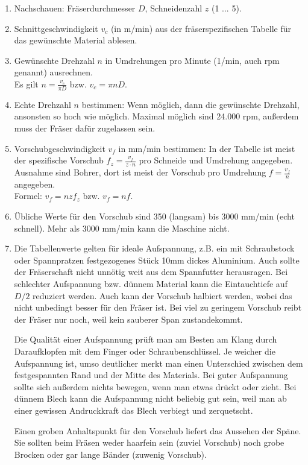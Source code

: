 \documentclass{\basedir/fablab-document}
\begin{document}
\begin{enumerate}
	\item Nachschauen: Fräserdurchmesser $D$, Schneidenzahl $z$ (1 ... 5).
	\item Schnittgeschwindigkeit $v_c$ (in m/min) aus der fräserspezifischen Tabelle für das gewünschte Material ablesen.
	\item Gewünschte Drehzahl $n$ in Umdrehungen pro Minute (1/min, auch rpm genannt) ausrechnen.\\
		Es gilt $n=\frac{v_c}{\pi D}$ bzw. $v_c=\pi n D$.
	\item Echte Drehzahl $n$ bestimmen: Wenn möglich, dann die gewünschte Drehzahl, ansonsten so hoch wie möglich. Maximal möglich sind 24.000 rpm, außerdem muss der Fräser dafür zugelassen sein.
	\item Vorschubgeschwindigkeit $v_f$ in mm/min bestimmen: In der Tabelle ist meist der spezifische Vorschub $f_z=\frac{v_f}{z\cdot n}$ pro Schneide und Umdrehung angegeben. Ausnahme sind Bohrer, dort ist meist der Vorschub pro Umdrehung $f=\frac{v_f}{n}$ angegeben. \\
		Formel: $v_f = n z f_z$ bzw. $v_f=n f$.
	\item Übliche Werte für den Vorschub sind 350 (langsam) bis 3000 mm/min (echt schnell). Mehr als 3000 mm/min kann die Maschine nicht.
	\item Die Tabellenwerte gelten für ideale Aufspannung, z.B. ein mit Schraubstock oder Spannpratzen festgezogenes Stück 10mm dickes Aluminium. Auch sollte der Fräserschaft nicht unnötig weit aus dem Spannfutter herausragen. Bei schlechter Aufspannung bzw. dünnem Material kann die Eintauchtiefe auf $D/2$ reduziert werden. Auch kann der Vorschub halbiert werden, wobei das nicht unbedingt besser für den Fräser ist. Bei viel zu geringem Vorschub reibt der Fräser nur noch, weil kein sauberer Span zustandekommt.

		Die Qualität einer Aufspannung prüft man am Besten am Klang durch Daraufklopfen mit dem Finger oder Schraubenschlüssel. Je weicher die Aufspannung ist, umso deutlicher merkt man einen Unterschied zwischen dem festgespannten Rand und der Mitte des Materials. Bei guter Aufspannung sollte sich außerdem nichts bewegen, wenn man etwas drückt oder zieht. Bei dünnem Blech kann die Aufspannung nicht beliebig gut sein, weil man ab einer gewissen Andruckkraft das Blech verbiegt und zerquetscht.
		
		Einen groben Anhaltspunkt für den Vorschub liefert das Aussehen der Späne. Sie sollten beim Fräsen weder haarfein sein (zuviel Vorschub) noch grobe Brocken oder gar lange Bänder (zuwenig Vorschub).
\end{enumerate}
\end{document}
